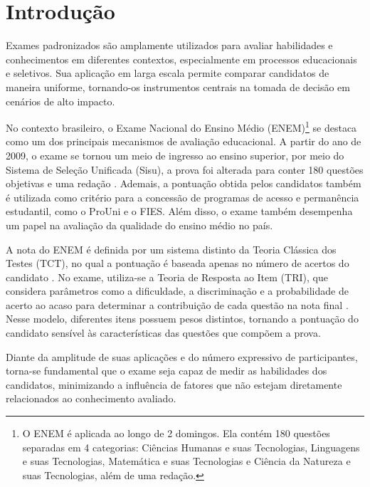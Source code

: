 \documentclass[a4paper,10pt, twocolumn]{article}
\begin{document}
\section{Introdução}

Exames padronizados são amplamente utilizados para avaliar habilidades e conhecimentos em diferentes contextos, especialmente em processos educacionais e seletivos. Sua aplicação em larga escala permite comparar candidatos de maneira uniforme, tornando-os instrumentos centrais na tomada de decisão em cenários de alto impacto.

No contexto brasileiro, o Exame Nacional do Ensino Médio (ENEM)\footnote{O ENEM é aplicada ao longo de 2 domingos. Ela contém 180 questões separadas em 4 categorias: Ciências Humanas e suas Tecnologias, Linguagens e suas Tecnologias, Matemática e suas Tecnologias e Ciência da Natureza e suas Tecnologias, além de uma redação.} se destaca como um dos principais mecanismos de avaliação educacional. A partir do ano de 2009, o exame se tornou um meio de ingresso ao ensino superior, por meio do Sistema de Seleção Unificada (Sisu), a prova foi alterada para conter 180 questões objetivas e uma redação \cite{Inep_2020}. Ademais, a pontuação obtida pelos candidatos também é utilizada como critério para a concessão de programas de acesso e permanência estudantil, como o ProUni e o FIES. Além disso, o exame também desempenha um papel na avaliação da qualidade do ensino médio no país.

A nota do ENEM é definida por um sistema distinto da Teoria Clássica dos Testes (TCT), no qual a pontuação é baseada apenas no número de acertos do candidato \cite{sousa_teoria_2020}. No exame, utiliza-se a Teoria de Resposta ao Item (TRI), que considera parâmetros como a dificuldade, a discriminação e a probabilidade de acerto ao acaso para determinar a contribuição de cada questão na nota final \cite{inep2021enem}. Nesse modelo, diferentes itens possuem pesos distintos, tornando a pontuação do candidato sensível às características das questões que compõem a prova. 


Diante da amplitude de suas aplicações e do número expressivo de participantes, torna-se fundamental que o exame seja capaz de medir as habilidades dos candidatos, minimizando a influência de fatores que não estejam diretamente relacionados ao conhecimento avaliado.
\end{document}

